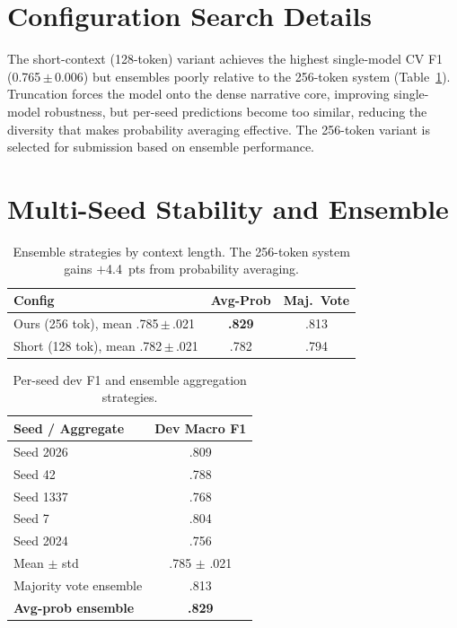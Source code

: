 \documentclass[11pt]{article}
\begin{document}
\section{Configuration Search Details}
\label{app:configs}

The short-context (128-token) variant achieves the highest single-model CV F1 (0.765\,$\pm$\,0.006) but ensembles poorly relative to the 256-token system (Table~\ref{tab:ensemble}).
Truncation forces the model onto the dense narrative core, improving single-model robustness, but per-seed predictions become too similar, reducing the diversity that makes probability averaging effective.
The 256-token variant is selected for submission based on ensemble performance.

\section{Multi-Seed Stability and Ensemble}
\label{app:ensemble}

\begin{table}[h]
\centering\small
\begin{tabular}{@{}lcc@{}}
\toprule
\textbf{Config} & \textbf{Avg-Prob} & \textbf{Maj.\ Vote} \\
\midrule
Ours (256 tok), mean .785\,$\pm$\,.021 & \textbf{.829} & .813 \\
Short (128 tok), mean .782\,$\pm$\,.021 & .782 & .794 \\
\bottomrule
\end{tabular}
\caption{Ensemble strategies by context length. The 256-token system gains $+$4.4~pts from probability averaging.}
\label{tab:ensemble}
\end{table}

\begin{table}[h]
\centering\small
\begin{tabular}{@{}lc@{}}
\toprule
\textbf{Seed / Aggregate} & \textbf{Dev Macro F1} \\
\midrule
Seed 2026              & .809 \\
Seed 42                & .788 \\
Seed 1337              & .768 \\
Seed 7                 & .804 \\
Seed 2024              & .756 \\
\midrule
Mean $\pm$ std         & .785 $\pm$ .021 \\
Majority vote ensemble & .813 \\
\textbf{Avg-prob ensemble} & \textbf{.829} \\
\bottomrule
\end{tabular}
\caption{Per-seed dev F1 and ensemble aggregation strategies.}
\label{tab:seeds}
\end{table}
\end{document}
